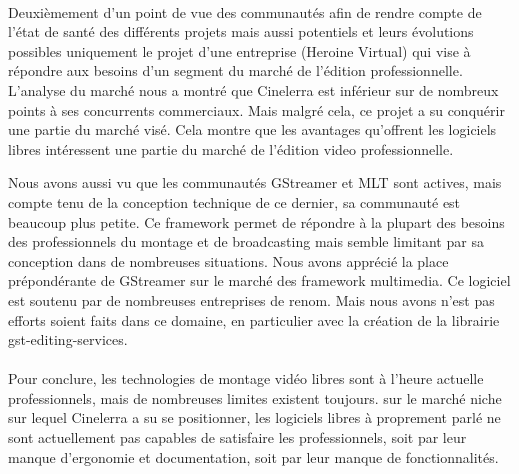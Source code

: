 \paragraph{}

Deuxièmement d'un point de vue des communautés afin de rendre compte
de l'état de santé des différents projets mais aussi %
potentiels et leurs évolutions possibles %
uniquement le projet d'une entreprise (Heroine Virtual) qui vise
à répondre aux besoins d'un segment du marché de l'édition
professionnelle. L'analyse du marché nous a montré que Cinelerra
est inférieur sur de nombreux points à ses concurrents commerciaux.
Mais malgré cela, ce projet a su conquérir une partie du marché
visé. Cela montre que les avantages qu'offrent les logiciels libres
intéressent une partie du marché de l'édition video professionnelle.


Nous avons aussi vu que les communautés GStreamer et MLT sont actives,
mais compte tenu de la conception technique de ce dernier, sa communauté
est beaucoup plus petite. Ce framework permet de répondre à la plupart
des besoins des professionnels du montage et de broadcasting mais semble
limitant par sa conception dans de nombreuses situations.  Nous avons
apprécié la place prépondérante de GStreamer sur le marché des
framework multimedia. Ce logiciel est soutenu par de nombreuses entreprises
de renom. Mais nous avons %
n'est pas %
efforts soient faits dans ce domaine, en particulier avec la création de
la librairie gst-editing-services.

\paragraph{}

Pour conclure, les technologies de montage vidéo libres sont à l'heure
actuelle %
professionnels, mais de nombreuses limites existent toujours. %
sur le marché niche sur lequel Cinelerra a su se positionner, les
logiciels libres à proprement parlé ne sont actuellement pas capables
de satisfaire les professionnels, soit par leur manque d'ergonomie et
documentation, soit par leur manque de fonctionnalités.

\paragraph{}


